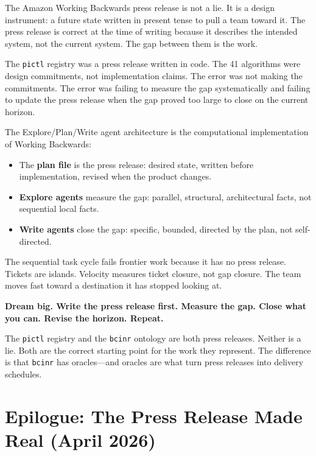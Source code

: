 \documentclass[11pt,a4paper]{article}
\newcommand{\code}[1]{\texttt{#1}}
\begin{document}
The Amazon Working Backwards press release is not a lie.  It is a design
instrument: a future state written in present tense to pull a team toward it.
The press release is correct at the time of writing because it describes the
intended system, not the current system.  The gap between them is the work.

The \code{pictl} registry was a press release written in code.  The 41
algorithms were design commitments, not implementation claims.  The error was
not making the commitments.  The error was failing to measure the gap
systematically and failing to update the press release when the gap proved too
large to close on the current horizon.

The Explore/Plan/Write agent architecture is the computational implementation
of Working Backwards:

\begin{itemize}
  \item The \textbf{plan file} is the press release: desired state, written
    before implementation, revised when the product changes.
  \item \textbf{Explore agents} measure the gap: parallel, structural,
    architectural facts, not sequential local facts.
  \item \textbf{Write agents} close the gap: specific, bounded, directed by
    the plan, not self-directed.
\end{itemize}

The sequential task cycle fails frontier work because it has no press release.
Tickets are islands.  Velocity measures ticket closure, not gap closure.  The
team moves fast toward a destination it has stopped looking at.

\medskip

\textbf{Dream big.  Write the press release first.  Measure the gap.  Close
what you can.  Revise the horizon.  Repeat.}

\medskip

The \code{pictl} registry and the \code{bcinr} ontology are both press
releases.  Neither is a lie.  Both are the correct starting point for the work
they represent.  The difference is that \code{bcinr} has oracles---and oracles
are what turn press releases into delivery schedules.

\section{Epilogue: The Press Release Made Real (April 2026)}
\end{document}
